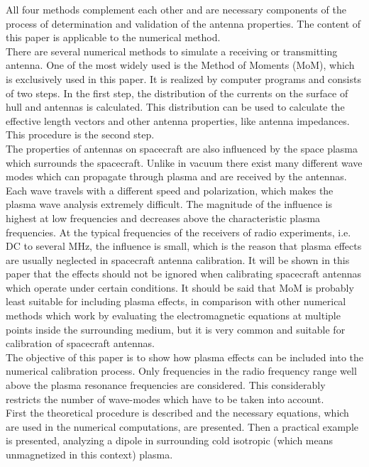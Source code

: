 \documentclass[two-coloumn,ras]{agutex}
\begin{document}
\begin{article}
All four methods complement each other and are necessary components of the process of determination and validation of the antenna properties. The content of this paper is applicable to the numerical method.\\

There are several numerical methods to simulate a receiving or transmitting antenna. One of the most widely used is the Method of Moments (MoM), which is exclusively used in this paper. It is realized by computer programs and consists of two steps. In the first step, the distribution of the currents on the surface of hull and antennas is calculated. This distribution can be used to calculate the effective length vectors and other antenna properties, like antenna impedances. This procedure is the second step.\\

The properties of antennas on spacecraft are also influenced by the space plasma which surrounds the spacecraft. Unlike in vacuum there exist many different wave modes which can propagate through plasma and are received by the antennas. Each wave travels with a different speed and polarization, which makes the plasma wave analysis extremely difficult. The magnitude of the influence is highest at low frequencies and decreases above the characteristic plasma frequencies. At the typical frequencies of the receivers of radio experiments, i.e. DC to several MHz, the influence is small, which is the reason that plasma effects are usually neglected in spacecraft antenna calibration. It will be shown in this paper that the effects should not be ignored when calibrating spacecraft antennas which operate under certain conditions. It should be said that MoM is probably least suitable for including plasma effects, in comparison with other numerical methods which work by evaluating the electromagnetic equations at multiple points inside the surrounding medium, but it is very common and suitable for calibration of spacecraft antennas.\\

The objective of this paper is to show how plasma effects can be included into the numerical calibration process. Only frequencies in the radio frequency range well above the plasma resonance frequencies are considered. This considerably restricts the number of wave-modes which have to be taken into account.\\

First the theoretical procedure is described and the necessary equations, which are used in the numerical computations, are presented. Then a practical example is presented, analyzing a dipole in surrounding cold isotropic (which means unmagnetized in this context) plasma.\\


\end{article}
\end{document}
